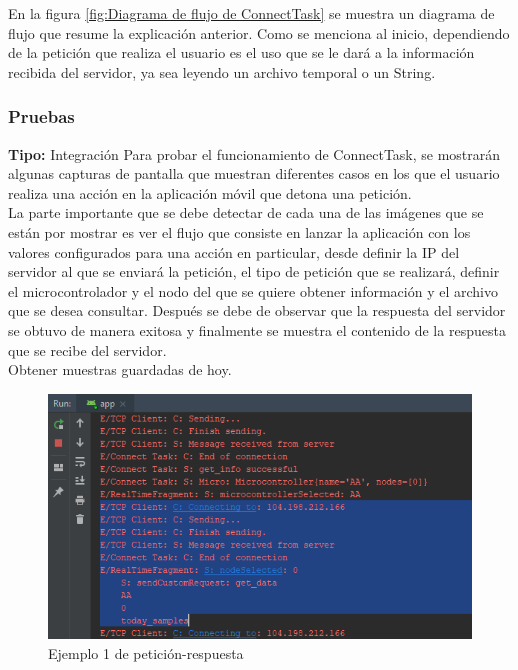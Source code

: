 En la figura \ref{fig:Diagrama de flujo de ConnectTask} se muestra un diagrama de flujo que resume la explicación anterior. Como se menciona al inicio, dependiendo de la petición que realiza el usuario es el uso que se le dará a la información recibida del servidor, ya sea leyendo un archivo temporal o un String.

\subsubsection{Pruebas}
\textbf{Tipo: }Integración \newline
Para probar el funcionamiento de ConnectTask, se mostrarán algunas capturas de pantalla que muestran diferentes casos en los que el usuario realiza una acción en la aplicación móvil que detona una petición.  
\\ \newline
La parte importante que se debe detectar de cada una de las imágenes que se están por mostrar es ver el flujo que consiste en lanzar la aplicación con los valores configurados para una acción en particular, desde definir la IP del servidor al que se enviará la petición, el tipo de petición que se realizará, definir el microcontrolador y el nodo del que se quiere obtener información y el archivo que se desea consultar. Después se debe de observar que la respuesta del servidor se obtuvo de manera exitosa y finalmente se muestra el contenido de la respuesta que se recibe del servidor.
\\ \newline
Obtener muestras guardadas de hoy.
\begin{figure}[H]
	\centering
	\includegraphics[scale=.4]{Capitulo5/images/connect1.png}
	\caption{Ejemplo 1 de petición-respuesta}	\label{fig:connect1}
\end{figure} 

